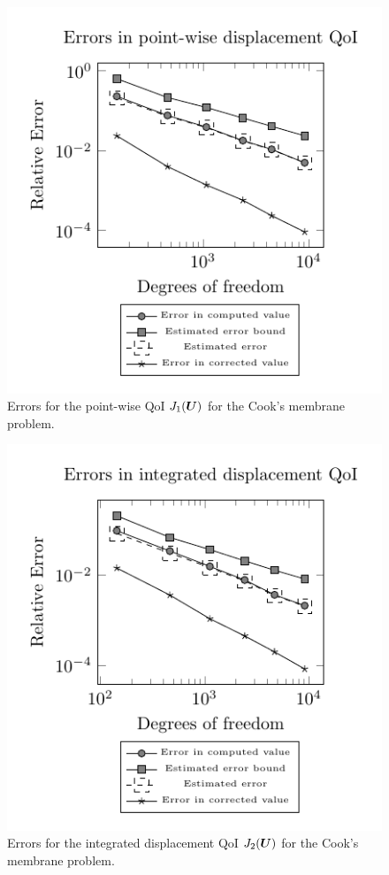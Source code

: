 \begin{figure}[ht!]
\centering
\includegraphics[width=.75\linewidth]{img/mech_cooks_pw_error_plot.pdf}
\caption{Errors for the point-wise QoI $J_1(\boldsymbol{U})$ for the
Cook's membrane problem.}
\label{fig:mech_cooks_error_1}
\end{figure}

\begin{figure}[ht!]
\centering
\includegraphics[width=.75\linewidth]{img/mech_cooks_avg_disp_error_plot.pdf}
\caption{Errors for the integrated displacement QoI $J_2(\boldsymbol{U})$ for the
Cook's membrane problem.}
\label{fig:mech_cooks_error_2}
\end{figure}

